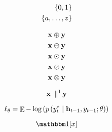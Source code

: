 \documentclass[a4paper,11pt]{article}
\DeclareMathOperator*{\E}{\mathbb{E}}
\begin{document}
\begin{align*}
	\{0,1\} \\
	\{a,\dots,z\}
\end{align*}

\begin{align*}
	\mathbf{x} \oplus \mathbf{y} \\
	\mathbf{x} \ominus \mathbf{y} \\
	\mathbf{x} \odot \mathbf{y} \\
	\mathbf{x} \oslash \mathbf{y} \\
	\mathbf{x} \otimes \mathbf{y} \\
\end{align*}

\begin{equation}
	\ve{x} \cat{1} \ve{y}
\end{equation}




\begin{equation}
	\ell_\theta = \E -\apply{\log}{\pc{y^{\ast}_{t}}{\ve{h}_{t-1},y_{t-1};\theta}}
\end{equation}

\begin{equation}
	\ind{x}
\end{equation}

	
\end{document}

